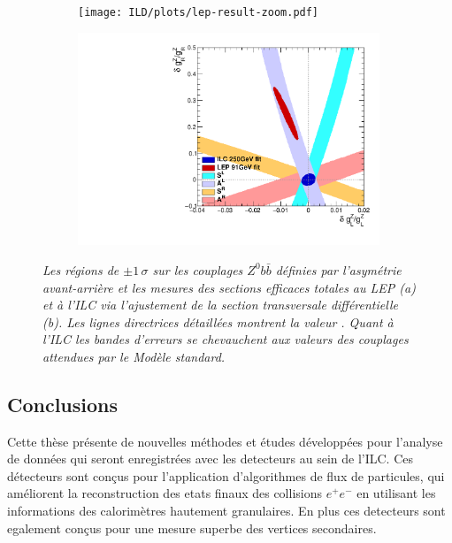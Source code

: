 \begin{figure}
	\centering
	\begin{subfigure}{0.5\textwidth}
		\texttt{[image: ILD/plots/lep-result-zoom.pdf]}
		\caption{\label{fig:LEPILCResult_a_3F} }
	\end{subfigure}%
	\begin{subfigure}{0.5\textwidth}
		\centering
		\includegraphics[width=0.99\textwidth]{ILD/plots/ilc-result.pdf}
		\caption{\label{fig:LEPILCResult_b_3F} }
	\end{subfigure}
	\caption{\sl Les régions de $\pm 1\,\sigma$ sur les couplages $Z^0b\bar{b}$ définies par l'asymétrie avant-arrière et les mesures des sections efficaces totales au LEP (a) et à l'ILC via l'ajustement de la section transversale différentielle (b). Les lignes directrices détaillées montrent la valeur \sm. Quant à l'ILC les bandes d'erreurs se chevauchent aux valeurs des couplages attendues par le Modèle standard.  }
	\label{fig:LEPILCResult_3F}
\end{figure}

\subsection*{Conclusions}

Cette thèse présente de nouvelles méthodes et études développées pour l'analyse de données qui seront enregistrées avec les detecteurs au sein de l'ILC. 
Ces détecteurs sont conçus pour l'application d'algorithmes de flux de particules, qui améliorent la reconstruction des etats finaux des collisions $e^+e^-$ en utilisant les informations des calorimètres hautement granulaires.
En plus ces detecteurs sont egalement conçus pour une mesure superbe des vertices secondaires.

